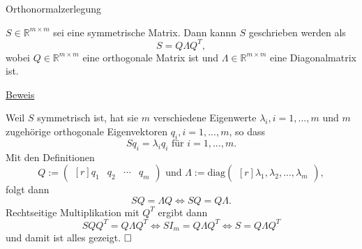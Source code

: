 \documentclass[
  8pt,
  ignorenonframetext,
]{beamer}
\begin{document}
\begin{frame}{Orthonormalzerlegung}
\protect\hypertarget{orthonormalzerlegung-1}{}
\small
\begin{theorem}
\normalfont
$S \in \mathbb{R}^{m \times m}$ sei eine symmetrische Matrix. Dann kannn $S$
geschrieben werden als
\begin{equation}
S = Q \Lambda Q^T,
\end{equation}
wobei $Q \in \mathbb{R}^{m \times m}$ eine orthogonale Matrix ist und
$\Lambda \in \mathbb{R}^{m\times m}$ eine Diagonalmatrix ist.
\end{theorem}
\vspace{-2mm}

\footnotesize

\underline{Beweis}

Weil \(S\) symmetrisch ist, hat sie \(m\) verschiedene Eigenwerte
\(\lambda_i, i = 1,...,m\) und \(m\) zugehörige orthogonale
Eigenvektoren \(q_i, i = 1,...,m\), so dass \begin{equation}
Sq_i = \lambda_i q_i \mbox{ für } i = 1,...,m.
\end{equation} Mit den Definitionen \begin{equation}
Q :=
\begin{pmatrix*}[r]
q_1 & q_2 & \cdots & q_m
\end{pmatrix*}
\mbox{ und }
\Lambda :=
\mbox{diag}\begin{pmatrix*}[r]
\lambda_1,\lambda_2,...,\lambda_m
\end{pmatrix*},
\end{equation} folgt dann \begin{equation}
SQ = \Lambda Q
\Leftrightarrow
SQ = Q\Lambda.
\end{equation} Rechtseitige Multiplikation mit \(Q^T\) ergibt dann
\begin{equation}
SQQ^T = Q \Lambda Q^T
\Leftrightarrow SI_m = Q \Lambda Q^T
\Leftrightarrow S    = Q \Lambda Q^T
\end{equation} und damit ist alles gezeigt. \(\hfill \Box\)
\end{frame}
\end{document}

